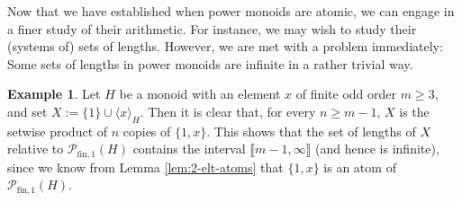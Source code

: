 \documentclass{report}
\renewcommand{\P}{\mathcal{P}}
\newcommand{\llb}{\llbracket}
\newcommand{\rrb}{\rrbracket}
\newcommand{\fun}{{\textrm{fin}, 1}}
\renewcommand{\:}{\text{:}}
\theoremstyle{definition}
\newtheorem{eg}[defn]{Example}
\begin{document}
Now that we have established when power monoids are atomic, we can engage in a finer study of their arithmetic. For instance, we may wish to study their (systems of) sets of lengths. However, we are met with a problem immediately: Some sets of lengths in power monoids are infinite in a rather trivial way.
%
\begin{eg}\label{eg:unbounded-fzn}
Let $H$ be a monoid with an element $x$ of finite odd order $m \ge 3$, and set $X := \{1 \} \cup \langle x \rangle_H$. Then it is clear that, for every $n \ge m-1$, $X$ is the setwise product of $n$ copies of $\{1, x\}$. This shows that the set of lengths of $X$ relative to $\P_\fun(H)$ contains the interval $\llb m-1, \infty \rrb$ (and hence is infinite), since we know from Lemma \ref{lem:2-elt-atoms} that $\{1, x\}$ is an atom of $\P_\fun(H)$.
\end{eg}
\end{document}

